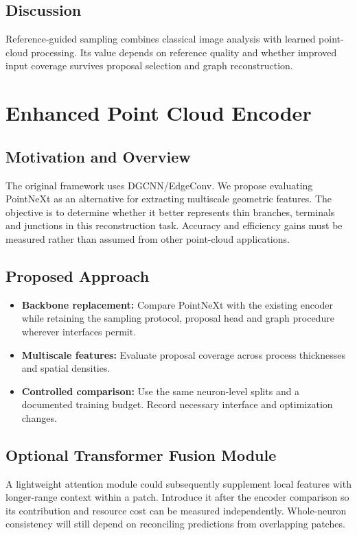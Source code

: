 \documentclass[11pt,a4paper]{article}
\begin{document}
\subsection{Discussion}
Reference-guided sampling combines classical image analysis with learned point-cloud processing. Its value depends on reference quality and whether improved input coverage survives proposal selection and graph reconstruction.

\section{Enhanced Point Cloud Encoder}

\subsection{Motivation and Overview}
The original framework uses DGCNN/EdgeConv. We propose evaluating PointNeXt as an alternative for extracting multiscale geometric features. The objective is to determine whether it better represents thin branches, terminals and junctions in this reconstruction task. Accuracy and efficiency gains must be measured rather than assumed from other point-cloud applications.

\subsection{Proposed Approach}
\begin{itemize}
    \item \textbf{Backbone replacement:} Compare PointNeXt with the existing encoder while retaining the sampling protocol, proposal head and graph procedure wherever interfaces permit.
    \item \textbf{Multiscale features:} Evaluate proposal coverage across process thicknesses and spatial densities.
    \item \textbf{Controlled comparison:} Use the same neuron-level splits and a documented training budget. Record necessary interface and optimization changes.
\end{itemize}

\subsection{Optional Transformer Fusion Module}
A lightweight attention module could subsequently supplement local features with longer-range context within a patch. Introduce it after the encoder comparison so its contribution and resource cost can be measured independently. Whole-neuron consistency will still depend on reconciling predictions from overlapping patches.
\end{document}
